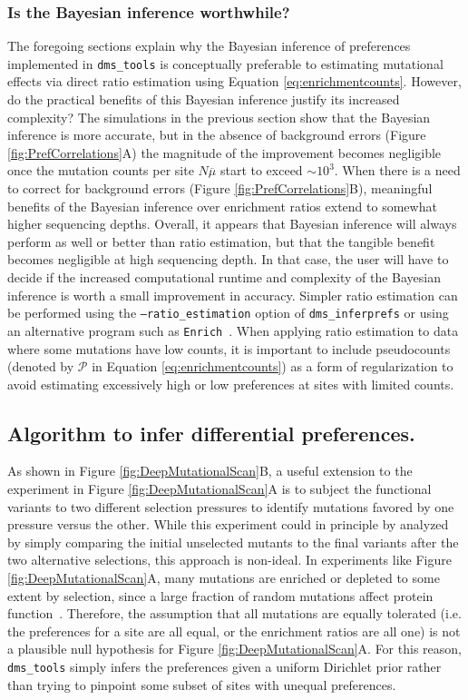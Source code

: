 \documentclass[twocolumn]{bmcart}%
\begin{document}
\subsubsection*{Is the Bayesian inference worthwhile?}
The foregoing sections explain why the Bayesian inference of preferences implemented in \texttt{dms\_tools} is conceptually preferable to estimating mutational effects via direct ratio estimation using Equation \ref{eq:enrichmentcounts}. However, do the practical benefits of this Bayesian inference justify its increased complexity? The simulations in the previous section show that the Bayesian inference is more accurate, but in the absence of background errors (Figure \ref{fig:PrefCorrelations}A) the magnitude of the improvement becomes negligible once the mutation counts per site $N \overline{\mu}$ start to exceed $\sim10^3$. When there is a need to correct for background errors (Figure \ref{fig:PrefCorrelations}B), meaningful benefits of the Bayesian inference over enrichment ratios extend to somewhat higher sequencing depths. Overall, it appears that Bayesian inference will always perform as well or better than ratio estimation, but that the tangible benefit becomes negligible at high sequencing depth. In that case, the user will have to decide if the increased computational runtime and complexity of the Bayesian inference is worth a small improvement in accuracy. Simpler ratio estimation can be performed using the \texttt{--ratio\_estimation} option of \texttt{dms\_inferprefs} or using an alternative program such as \texttt{Enrich}~\cite{fowler2011enrich}. When applying ratio estimation to data where some mutations have low counts, it is important to include pseudocounts (denoted by $\mathcal{P}$ in Equation \ref{eq:enrichmentcounts}) as a form of regularization to avoid estimating excessively high or low preferences at sites with limited counts.

\subsection*{Algorithm to infer differential preferences.}
As shown in Figure \ref{fig:DeepMutationalScan}B, a useful extension to the experiment in Figure \ref{fig:DeepMutationalScan}A is to subject the functional variants to two different selection pressures to identify mutations favored by one pressure versus the other. While this experiment could in principle by analyzed by simply comparing the initial unselected mutants to the final variants after the two alternative selections, this approach is non-ideal. In experiments like Figure \ref{fig:DeepMutationalScan}A, many mutations are enriched or depleted to some extent by selection, since a large fraction of random mutations affect protein function~\cite{shortle1985,rennell1991,shafikhani1997,guo2004,bloom2005}. Therefore, the assumption that all mutations are equally tolerated (i.e. the preferences for a site are all equal, or the enrichment ratios are all one) is not a plausible null hypothesis for Figure \ref{fig:DeepMutationalScan}A. For this reason, \texttt{dms\_tools} simply infers the preferences given a uniform Dirichlet prior rather than trying to pinpoint some subset of sites with unequal preferences. 
\end{document}
